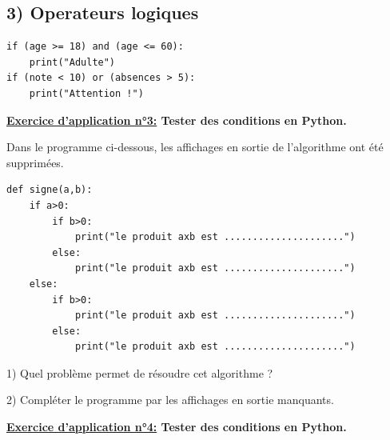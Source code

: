 \documentclass[12pt]{article}
\begin{document}
\subsection*{3) Operateurs logiques}
\begin{lstlisting}[caption={Combinaison de conditions}]
if (age >= 18) and (age <= 60):
    print("Adulte")
if (note < 10) or (absences > 5):
    print("Attention !")
\end{lstlisting}

\begin{mdframed}[
    linewidth=1pt,
    roundcorner=5pt,
    linecolor=RoyalBlue,
    innertopmargin=10pt,
    innerbottommargin=10pt
]
{\color{RoyalBlue}
\textbf{\underline{Exercice d'application n°3:} Tester des conditions en Python.}}

\vspace{5pt}
Dans le programme ci-dessous, les affichages en sortie de l'algorithme ont été supprimées.

\begin{lstlisting}
def signe(a,b):
    if a>0:
        if b>0:
            print("le produit axb est .....................")
        else:
            print("le produit axb est .....................")
    else:
        if b>0:
            print("le produit axb est .....................")
        else:
            print("le produit axb est .....................")
\end{lstlisting}

\vspace{5pt}
\hspace{1cm}1) Quel problème permet de résoudre cet
algorithme ?

\hspace{1cm}2) Compléter le programme par les
affichages en sortie manquants.

\vspace{0.5cm}
{\color{black!45}\dotfill}

\vspace{0.5cm}
{\color{black!45}\dotfill}

\vspace{0.5cm}
{\color{black!45}\dotfill}

\vspace{0.5cm}
{\color{black!45}\dotfill}


\vspace{20pt}

\newpage
{\color{RoyalBlue}
\textbf{\underline{Exercice d'application n°4:} Tester des conditions en Python.}}


\end{mdframed}
\end{document}

